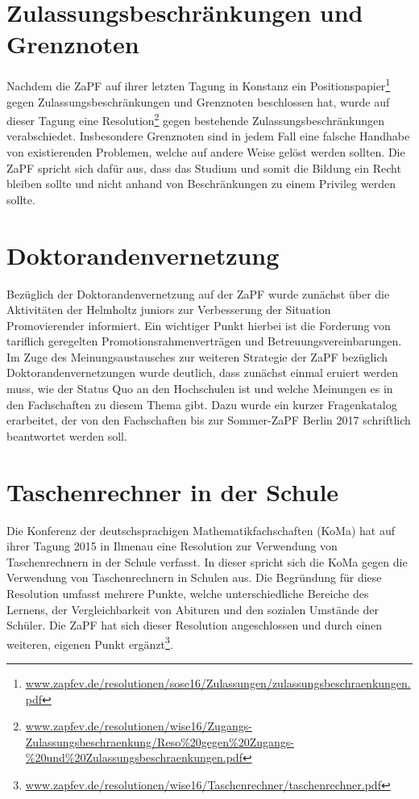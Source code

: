 \section*{Zulassungsbeschränkungen und Grenznoten}
Nachdem  die ZaPF auf ihrer letzten Tagung in Konstanz ein Positionspapier\footnote{\href{https://zapfev.de/resolutionen/sose16/Zulassungen/zulassungsbeschraenkungen.pdf}{\url{www.zapfev.de/resolutionen/sose16/Zulassungen/zulassungsbeschraenkungen.pdf}}} 
gegen Zulassungsbeschränkungen und Grenznoten beschlossen hat, wurde auf dieser Tagung eine Resolution\footnote{\href{https://zapfev.de/resolutionen/wise16/Zugangs-Zulassungsbeschraenkung/Reso\%20gegen\%20Zugangs-\%20und\%20Zulassungsbeschraenkungen.pdf}{\url{www.zapfev.de/resolutionen/wise16/Zugangs-Zulassungsbeschraenkung/Reso\%20gegen\%20Zugangs-\%20und\%20Zulassungsbeschraenkungen.pdf}}} 
gegen bestehende Zulassungsbeschränkungen verabschiedet. Insbesondere Grenznoten sind in jedem Fall eine falsche Handhabe von existierenden  Problemen, welche auf 
andere Weise gelöst werden sollten. Die ZaPF spricht sich dafür aus, dass das Studium und somit die Bildung ein Recht bleiben sollte und nicht anhand von 
Beschränkungen zu einem Privileg werden sollte.
		
\section*{Doktorandenvernetzung}
Bezüglich der Doktorandenvernetzung auf der ZaPF wurde zunächst über die Aktivitäten der Helmholtz juniors zur Verbesserung der Situation Promovierender informiert. 
Ein wichtiger Punkt hierbei ist die Forderung von tariflich geregelten Promotionsrahmenverträgen und  Betreuungsvereinbarungen. \\
Im Zuge des Meinungsaustausches zur weiteren Strategie der ZaPF bezüglich Doktorandenvernetzungen wurde deutlich, dass zunächst einmal eruiert werden muss, wie der 
Status Quo an den Hochschulen ist und welche Meinungen es in den Fachschaften zu diesem Thema gibt. Dazu wurde ein kurzer Fragenkatalog erarbeitet, der von den 
Fachschaften bis zur Sommer-ZaPF Berlin 2017 schriftlich beantwortet werden soll. 
		
\section*{Taschenrechner in der Schule}
Die Konferenz der deutschsprachigen Mathematikfachschaften (KoMa) hat auf ihrer Tagung 2015 in Ilmenau eine Resolution zur Verwendung von Taschenrechnern in der Schule 
verfasst. In dieser spricht sich die KoMa gegen die Verwendung von Taschenrechnern in Schulen aus. Die Begründung für diese Resolution umfasst mehrere Punkte, 
welche unterschiedliche Bereiche des Lernens, der Vergleichbarkeit von Abituren und den sozialen Umstände der Schüler. Die ZaPF hat sich dieser Resolution 
angeschlossen und durch einen weiteren, eigenen Punkt ergänzt\footnote{\href{https://zapfev.de/resolutionen/wise16/Taschenrechner/taschenrechner.pdf}{\url{www.zapfev.de/resolutionen/wise16/Taschenrechner/taschenrechner.pdf}}}. 
		
